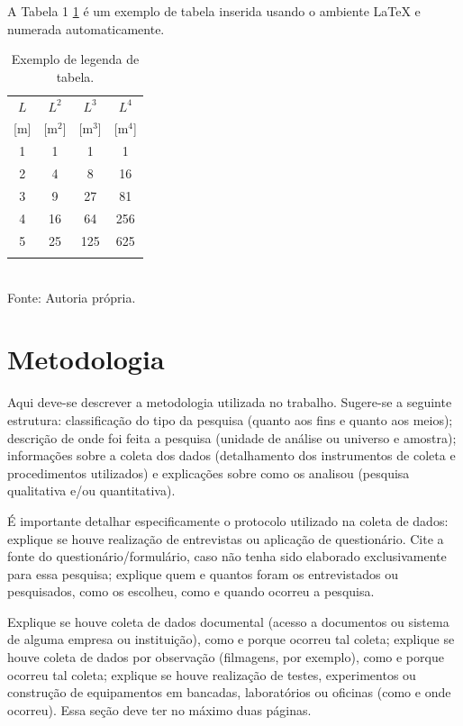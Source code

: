 \documentclass[
article,			%
11pt,				%
twoside,			%
a4paper,			%
section=TITLE,		%
onecolumn,          %
english,			%
brazil,				%
sumario=tradicional
]{abntex2}
\begin{document}
A Tabela 1 \ref{tab:Ldimens} é um exemplo de tabela inserida usando o ambiente LaTeX e numerada automaticamente.

\begin{table}[!htb]
\centering%
\small%
\caption{Exemplo de legenda de tabela.}%
\label{tab:Ldimens}
\begin{tabular*}{\columnwidth}{@{\extracolsep{\fill}}cccc}
\toprule
$L$   & $L^2$     & $L^3$     & $L^4$     \\
{[m]} & {[m$^2$]} & {[m$^3$]} & {[m$^4$]} \\
\midrule
1     & 1         & 1         & 1         \\
2     & 4         & 8         & 16        \\
3     & 9         & 27        & 81        \\
4     & 16        & 64        & 256       \\
5     & 25        & 125       & 625       \\
\bottomrule
\addlinespace
\end{tabular*}
\\Fonte: Autoria própria.
\end{table}

    
\section{Metodologia}
    
Aqui deve-se descrever a metodologia utilizada no trabalho. Sugere-se a seguinte estrutura: classificação do tipo da pesquisa (quanto aos fins e quanto aos meios); descrição de onde foi feita a pesquisa (unidade de análise ou universo e amostra); informações sobre a coleta dos dados (detalhamento dos instrumentos de coleta e procedimentos utilizados) e explicações sobre como os analisou (pesquisa qualitativa e/ou quantitativa).

É importante detalhar especificamente o protocolo utilizado na coleta de dados: explique se houve realização de entrevistas ou aplicação de questionário. Cite a fonte do questionário/formulário, caso não tenha sido elaborado exclusivamente para essa pesquisa; explique quem e quantos foram os entrevistados ou pesquisados, como os escolheu, como e quando ocorreu a pesquisa. 

Explique se houve coleta de dados documental (acesso a documentos ou sistema de alguma empresa ou instituição), como e porque ocorreu tal coleta; explique se houve coleta de dados por observação (filmagens, por exemplo), como e porque ocorreu tal coleta; explique se houve realização de testes, experimentos ou construção de equipamentos em bancadas, laboratórios ou oficinas (como e onde ocorreu). Essa seção deve ter no máximo duas páginas.
\end{document}
